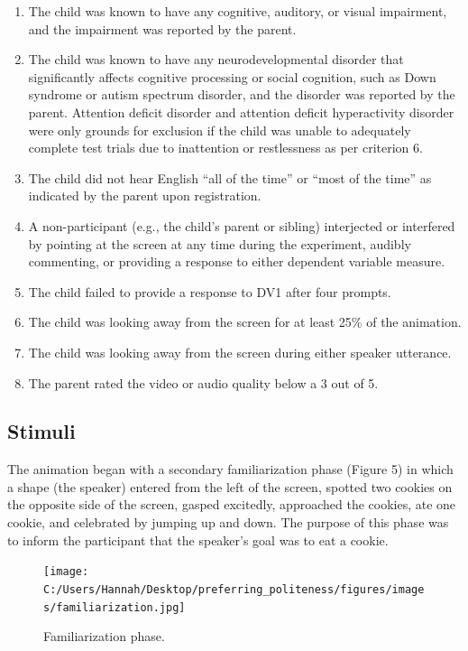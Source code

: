 \documentclass[
  english,
  man,floatsintext]{apa6}
\begin{document}
\begin{enumerate}
\def\labelenumi{\arabic{enumi}.}
\item
  The child was known to have any cognitive, auditory, or visual impairment, and the impairment was reported by the parent.
\item
  The child was known to have any neurodevelopmental disorder that significantly affects cognitive processing or social cognition, such as Down syndrome or autism spectrum disorder, and the disorder was reported by the parent. Attention deficit disorder and attention deficit hyperactivity disorder were only grounds for exclusion if the child was unable to adequately complete test trials due to inattention or restlessness as per criterion 6.
\item
  The child did not hear English ``all of the time'' or ``most of the time'' as indicated by the parent upon registration.
\item
  A non-participant (e.g., the child's parent or sibling) interjected or interfered by pointing at the screen at any time during the experiment, audibly commenting, or providing a response to either dependent variable measure.
\item
  The child failed to provide a response to DV1 after four prompts.
\item
  The child was looking away from the screen for at least 25\% of the animation.
\item
  The child was looking away from the screen during either speaker utterance.
\item
  The parent rated the video or audio quality below a 3 out of 5.
\end{enumerate}

\hypertarget{stimuli}{%
\subsection{Stimuli}\label{stimuli}}

The animation began with a secondary familiarization phase (Figure 5) in which a shape (the speaker) entered from the left of the screen, spotted two cookies on the opposite side of the screen, gasped excitedly, approached the cookies, ate one cookie, and celebrated by jumping up and down. The purpose of this phase was to inform the participant that the speaker's goal was to eat a cookie.

\begin{figure}
\centering
\texttt{[image: C:/Users/Hannah/Desktop/preferring\_politeness/figures/images/familiarization.jpg]}
\caption{Familiarization phase.}
\end{figure}
\end{document}
